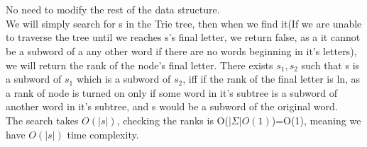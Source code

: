 \documentclass{article}
\begin{document}
\section{}
No need to modify the rest of the data structure.\\
We will simply search for s in the Trie tree, then when we find it(If we are unable to traverse the tree until we reaches s's final letter, we return false, as a it cannot be a subword of a any other word if there are no words beginning in it's letters), we will return the rank of the node's final letter.
There exists $s_1, s_2$ such that s is a subword of $s_1$ which is a subword of $s_2$, iff if the rank of the final letter is ln, as a rank of node is turned on only if some word in it's subtree is a subword of another word in it's subtree, and s would be a subword of the original word.\\
The search takes $O(|s|)$, checking the ranks is O($|\Sigma |O(1)$)=O(1), meaning we have $O(|s|)$ time complexity.
\end{document}
